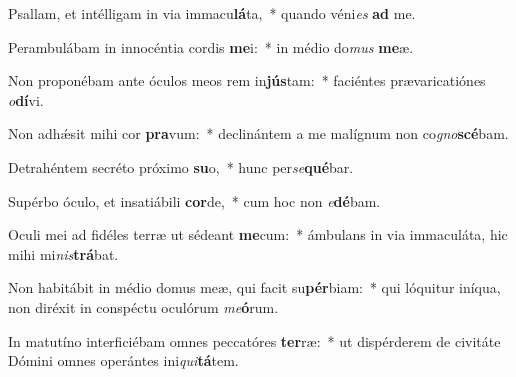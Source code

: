 \item Psallam, et intélligam in via immacu\textbf{lá}ta,~* quando véni\textit{es} \textbf{ad} me.
\item Perambulábam in innocéntia cordis \textbf{me}i:~* in médio do\textit{mus} \textbf{me}æ.
\item Non proponébam ante óculos meos rem in\textbf{jús}tam:~* faciéntes prævaricatiónes \textit{o}\textbf{dí}vi.
\item Non adhǽsit mihi cor \textbf{pra}vum:~* declinántem a me malígnum non co\textit{gno}\textbf{scé}bam.
\item Detrahéntem secréto próximo \textbf{su}o,~* hunc per\textit{se}\textbf{qué}bar.
\item Supérbo óculo, et insatiábili \textbf{cor}de,~* cum hoc non \textit{e}\textbf{dé}bam.
\item Oculi mei ad fidéles terræ ut sédeant \textbf{me}cum:~* ámbulans in via immaculáta, hic mihi mi\textit{nis}\textbf{trá}bat.
\item Non habitábit in médio domus meæ, qui facit su\textbf{pér}biam:~* qui lóquitur iníqua, non diréxit in conspéctu oculórum \textit{me}\textbf{ó}rum.
\item In matutíno interficiébam omnes peccatóres \textbf{ter}ræ:~* ut dispérderem de civitáte Dómini omnes operántes ini\textit{qui}\textbf{tá}tem.
